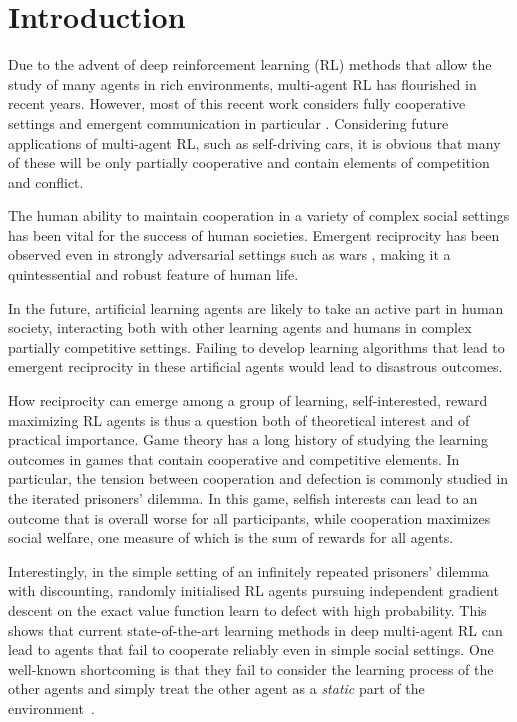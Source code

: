 \section{Introduction}
\label{sec:introduction}

 Due to the advent of deep reinforcement learning (RL) methods that allow the study of many agents in rich environments, multi-agent RL has flourished in recent years. However, most of this recent work considers fully cooperative settings \citep{omidshafiei2017deep,foerster2017counterfactual,foerster2017stabilising} and emergent communication in particular \citep{das2017learning,mordatch2017emergence,lazaridou2016multi,foerster2016learning,sukhbaatar2016learning}. Considering future applications of multi-agent RL, such as self-driving cars, it is obvious that many of these will be only partially cooperative and contain elements of competition and conflict.


The human ability to maintain cooperation in a variety of complex social settings has been vital for the success of human societies.  Emergent reciprocity has been observed even in strongly adversarial settings such as wars \citep{axelrod2006evolution}, making it a quintessential and robust feature of human life.

In the future, artificial learning agents are likely to take an active part in human society, interacting both with other learning agents and humans in complex partially competitive settings. Failing to develop learning algorithms that lead to emergent reciprocity in these artificial agents would lead to disastrous outcomes.

How reciprocity can emerge among a group of learning, self-interested, reward maximizing RL agents is thus a question both of theoretical interest and of practical importance. Game theory has a long history of studying the learning outcomes in games that contain cooperative and competitive elements. In particular, the tension between cooperation and defection is commonly studied in the iterated prisoners' dilemma. In this game, selfish interests can lead to an outcome that is overall worse for all participants, while cooperation maximizes social welfare, one measure of which is the sum of rewards for all agents. 


Interestingly, in the simple setting of an infinitely repeated prisoners' dilemma with discounting, randomly initialised RL agents pursuing independent gradient descent on the exact value function learn to defect with high probability. This shows that current state-of-the-art learning methods in deep multi-agent RL can lead to agents that fail to cooperate reliably even in simple social settings. 
One well-known shortcoming is that they fail to consider the learning process of the other agents and simply treat the other agent as a \emph{static} part of the environment~\citep{hernandez2017survey}. 

